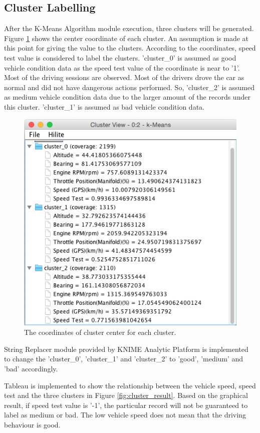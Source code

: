 \subsection{Cluster Labelling}
After the K-Means Algorithm module execution, three clusters will be generated. Figure \ref{fig:cluster} shows the center coordinate of each cluster. An assumption is made at this point for giving the value to the clusters. According to the coordinates, speed test value is considered to label the clusters. 'cluster\_0' is assumed as good vehicle condition data as the speed test value of the coordinate is near to '1'. Most of the driving sessions are observed. Most of the drivers drove the car as normal and did not have dangerous actions performed. So, 'cluster\_2' is assumed as medium vehicle condition data due to the larger amount of the records under this cluster. 'cluster\_1' is assumed as bad vehicle condition data.

\begin{figure}[hbt!]\centering
\includegraphics[height=.5\textwidth]{image/cluster}
\caption{The coordinates of cluster center for each cluster.}
\label{fig:cluster}
\end{figure}


String Replacer module provided by KNIME Analytic Platform is implemented to change the 'cluster\_0', 'cluster\_1' and 'cluster\_2' to 'good', 'medium' and 'bad' accordingly.

Tableau is implemented to show the relationship between the vehicle speed, speed test and the three clusters in Figure \ref{fig:cluster_result}. Based on the graphical result, if speed test value is '-1', the particular record will not be guaranteed to label as  medium or bad. The low vehicle speed does not mean that the driving behaviour is good.

